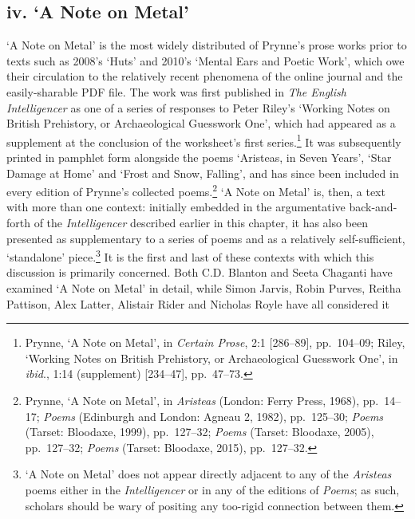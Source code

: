 \documentclass[]{article}
\begin{document}
\subsection{iv. ‘A Note on Metal’}\label{iv.-a-note-on-metal}

‘A Note on Metal’ is the most widely distributed of Prynne’s prose works
prior to texts such as 2008’s ‘Huts’ and 2010’s ‘Mental Ears and Poetic
Work’, which owe their circulation to the relatively recent phenomena of
the online journal and the easily-sharable PDF file. The work was first
published in \emph{The English Intelligencer} as one of a series of
responses to Peter Riley’s ‘Working Notes on British Prehistory, or
Archaeological Guesswork One’, which had appeared as a supplement at the
conclusion of the worksheet’s first series.\footnote{Prynne, ‘A Note on
  Metal’, in \emph{Certain Prose}, 2:1 {[}286–89{]}, pp.~104–09; Riley,
  ‘Working Notes on British Prehistory, or Archaeological Guesswork
  One’, in \emph{ibid}., 1:14 (supplement) {[}234–47{]}, pp.~47–73.} It
was subsequently printed in pamphlet form alongside the poems ‘Aristeas,
in Seven Years’, ‘Star Damage at Home’ and ‘Frost and Snow, Falling’,
and has since been included in every edition of Prynne’s collected
poems.\footnote{Prynne, ‘A Note on Metal’, in \emph{Aristeas} (London:
  Ferry Press, 1968), pp.~14–17; \emph{Poems} (Edinburgh and London:
  Agneau 2, 1982), pp.~125–30; \emph{Poems} (Tarset: Bloodaxe, 1999),
  pp.~127–32; \emph{Poems} (Tarset: Bloodaxe, 2005), pp.~127–32;
  \emph{Poems} (Tarset: Bloodaxe, 2015), pp.~127–32.} ‘A Note on Metal’
is, then, a text with more than one context: initially embedded in the
argumentative back-and-forth of the \emph{Intelligencer} described
earlier in this chapter, it has also been presented as supplementary to
a series of poems and as a relatively self-sufficient, ‘standalone’
piece.\footnote{‘A Note on Metal’ does not appear directly adjacent to
  any of the \emph{Aristeas} poems either in the \emph{Intelligencer} or
  in any of the editions of \emph{Poems}; as such, scholars should be
  wary of positing any too-rigid connection between them.} It is the
first and last of these contexts with which this discussion is primarily
concerned. Both C.D. Blanton and Seeta Chaganti have examined ‘A Note on
Metal’ in detail, while Simon Jarvis, Robin Purves, Reitha Pattison,
Alex Latter, Alistair Rider and Nicholas Royle have all considered it
\end{document}
